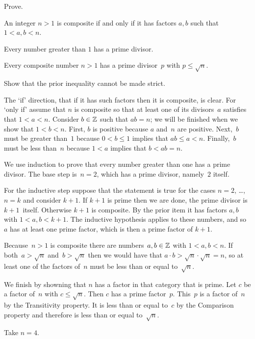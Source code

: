 \documentclass{ibl}
\begin{document}
\begin{ex} Prove.
\begin{exes}
\item An integer $n>1$ is composite if and only if it has factors $a,b$ 
  such that $1<a,b<n$.  
\item Every number greater than $1$ has a prime divisor.
\item Every composite number $n>1$ has a prime divisor~$p$ 
  with $p\leq \sqrt{n}$.
\item Show that the prior inequality cannot be made strict.     
\end{exes}
\begin{ans}
\begin{exes}
\item The `if' direction, that if it has such factors then it is composite,
  is clear.
  For `only if' assume that $n$ is composite so
  that at least one of its divisors~$a$ satisfies that $1<a<n$.
  Consider $b\in\mathbb{Z}$ such that $ab=n$; we will be finished when we show 
  that $1<b<n$.
  First, $b$ is positive because $a$ and~$n$ are positive.
  Next,~$b$ must be greater than~$1$ because $0<b\leq 1$ 
  implies that $ab\leq a<n$.
  Finally,~$b$ must be less than~$n$ because $1<a$ implies that $b<ab=n$. 
\item We use induction to prove that
  every number greater than one has a prime divisor.
  The base step is~$n=2$, which has a prime divisor, namely~$2$ itself.

  For the inductive step suppose that the statement is true for the cases 
  $n=2$, \ldots, $n=k$ and consider $k+1$.
  If $k+1$ is prime then we are done, the prime divisor is $k+1$~itself.
  Otherwise $k+1$ is composite.
  By the prior item it has factors $a,b$ with $1<a,b<k+1$.
  The inductive hypothesis applies to these numbers, and so~$a$ has at
  least one prime factor, which is then a prime factor of $k+1$.
\item Because~$n>1$ is composite there are numbers~$a,b\in\mathbb{Z}$ with
  $1<a,b<n$.
  If both~$a>\sqrt{n}$ and~$b>\sqrt{n}$ then we would have that
  $a\cdot b>\sqrt{n}\cdot\sqrt{n}=n$,
  so at least one of the factors of~$n$ must be less than or equal 
  to~$\sqrt{n}$.

  We finish by showning that $n$ has a factor in that category that is prime.
  Let $c$ be a factor of~$n$ with $c\leq\sqrt{n}$.
  Then $c$ has a prime factor~$p$.
  This~$p$ is a factor of~$n$ by the Transitivity property. 
  It is 
  less than or equal to~$c$ by the Comparison property and therefore
  is less than or equal to~$\sqrt{n}$.  
\item Take $n=4$.
\end{exes}
\end{ans}
\end{ex}
\end{document}
